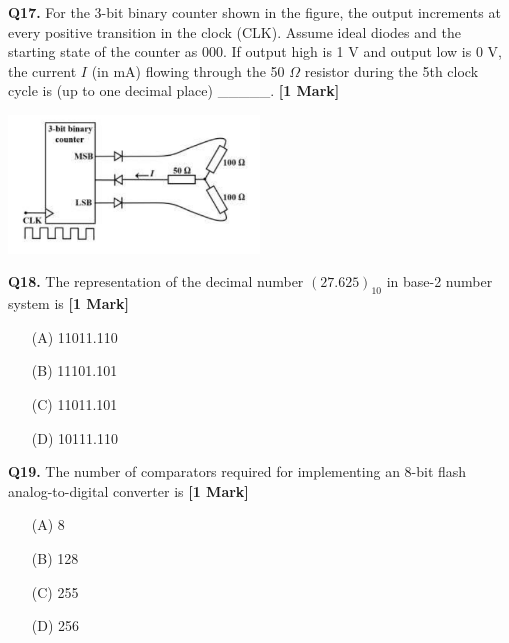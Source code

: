 \documentclass[11pt]{article}
\newcommand{\questiona}[2]{
    \noindent\textbf{Q#2.} #1 \hfill \textbf{[1 Mark]}
}
\begin{document}
\questiona{For the 3-bit binary counter shown in the figure, the output increments at every positive transition in the clock (CLK). Assume ideal diodes and the starting state of the counter as 000. If output high is 1 V and output low is 0 V, the current \(I\) (in mA) flowing through the 50 \(\Omega\) resistor during the 5th clock cycle is (up to one decimal place) \_\_\_\_\_.}{17}
\begin{center}
\includegraphics[width=0.5\textwidth]{figures/17.png}
\end{center}
\vspace{0.5cm}

\questiona{The representation of the decimal number \((27.625)_{10}\) in base-2 number system is}{18}
\begin{enumerate}
    \item[(A)] 11011.110
    \item[(B)] 11101.101
    \item[(C)] 11011.101
    \item[(D)] 10111.110
\end{enumerate}
\vspace{0.5cm}

\questiona{The number of comparators required for implementing an 8-bit flash analog-to-digital converter is}{19}
\begin{enumerate}
    \item[(A)] 8
    \item[(B)] 128
    \item[(C)] 255
    \item[(D)] 256
\end{enumerate}
\vspace{0.5cm}
\end{document}
